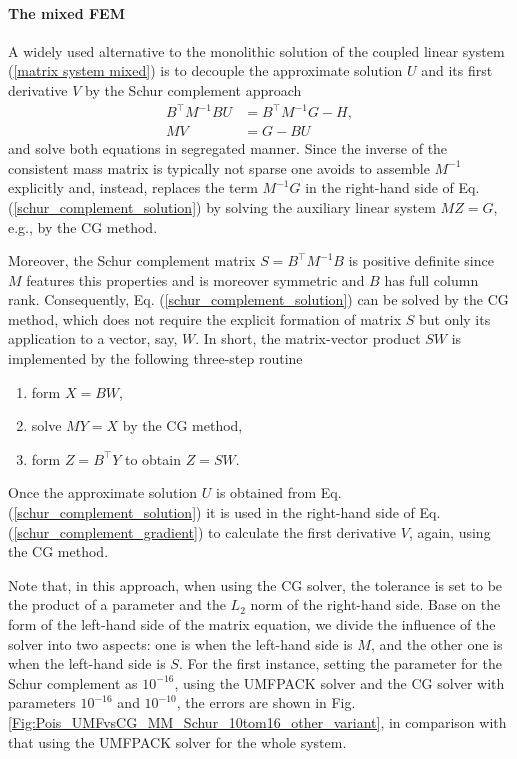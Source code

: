 \documentclass[final,3p]{elsarticle}
\begin{document}
\paragraph{The mixed FEM} A widely used alternative to the monolithic solution of the coupled linear system (\ref{matrix system mixed}) is to decouple the approximate solution $U$ and its first derivative $V$ by the Schur complement approach
\begin{subequations}
 \begin{align}
  B^{\top} M^{-1} B U &= B^{\top} M^{-1} G - H, 	\label{schur_complement_solution} \\
  MV&=G-BU					
  \label{schur_complement_gradient}
\end{align}
\end{subequations}
and solve both equations in segregated manner. Since the inverse of the consistent mass matrix is typically not sparse one avoids to assemble $M^{-1}$ explicitly and, instead, replaces the term $M^{-1}G$ in the right-hand side of Eq. (\ref{schur_complement_solution}) by solving the auxiliary linear system $MZ=G$, e.g., by the CG method. 

Moreover, the Schur complement matrix $S=B^\top M^{-1}B$ is positive definite since $M$ features this properties and is moreover symmetric and $B$ has full column rank. Consequently, Eq. (\ref{schur_complement_solution}) can be solved by the CG method, which does not require the explicit formation of matrix $S$ but only its application to a vector, say, $W$. In short, the matrix-vector product $SW$ is implemented by the following three-step routine
\begin{enumerate}
    \item form $X=BW$,
    \item solve $MY=X$ by the CG method,
    \item form $Z=B^\top Y$ to obtain $Z=SW$.
\end{enumerate}
Once the approximate solution $U$ is obtained from Eq. (\ref{schur_complement_solution}) it is used in the right-hand side of Eq. (\ref{schur_complement_gradient}) to calculate the first derivative $V$, again, using the CG method.


 
Note that, in this approach, when using the CG solver, the tolerance is set to be the product of a parameter and the $L_2$ norm of the right-hand side.
Base on the form of the left-hand side of the matrix equation, we divide the influence of the solver into two aspects: one is when the left-hand side is $M$, and the other one is when the left-hand side is $S$.
For the first instance, setting the parameter for the Schur complement as $10^{-16}$, using the UMFPACK solver and the CG solver with parameters $10^{-16}$ and $10^{-10}$, the errors are shown in Fig. \ref{Fig:Pois_UMFvsCG_MM_Schur_10tom16_other_variant}, in comparison with that using the UMFPACK solver for the whole system.
\end{document}
